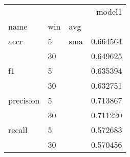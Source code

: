 
\begin{tabular}{lllr}
\toprule
     &    &     &    model1 \\
name & win & avg &           \\
\midrule
accr & 5  & sma &  0.664564 \\
     & 30 &     &  0.649625 \\
f1 & 5  &     &  0.635394 \\
     & 30 &     &  0.632751 \\
precision & 5  &     &  0.713867 \\
     & 30 &     &  0.711220 \\
recall & 5  &     &  0.572683 \\
     & 30 &     &  0.570456 \\
\bottomrule
\end{tabular} 